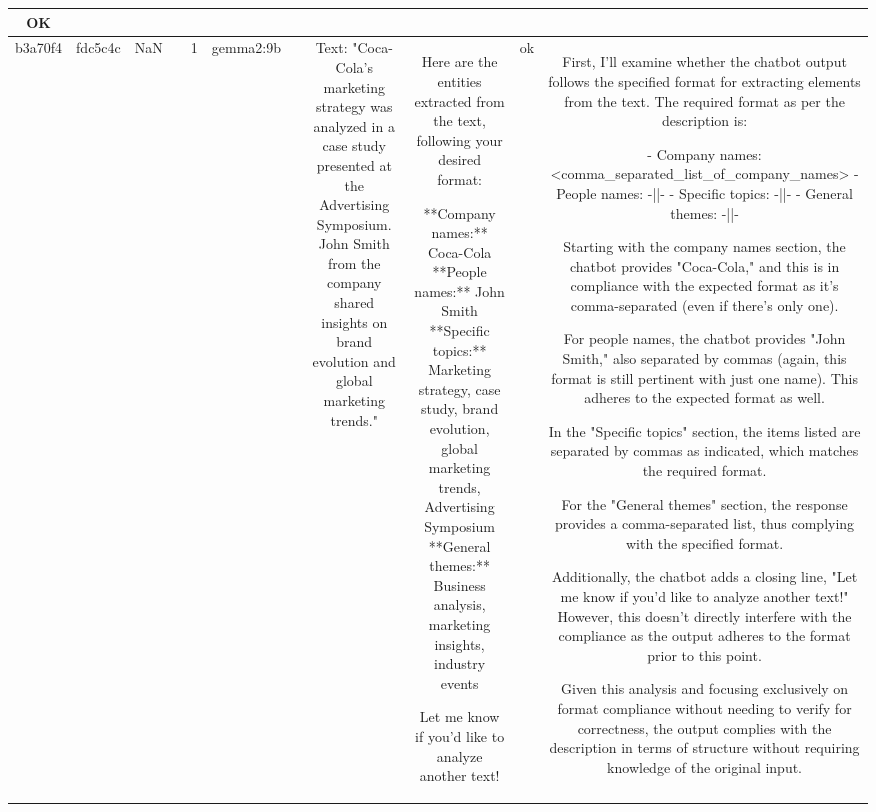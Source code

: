 \begin{table}[h!]
\begin{tabular}{|c|c|c|c|c|c|c|c|c|c|c|}
OK\\
\hline
b3a70f4 & fdc5c4c & NaN &  & 1 & gemma2:9b &  & Text: "Coca-Cola's marketing strategy was analyzed in a case study presented at the Advertising Symposium. John Smith from the company shared insights on brand evolution and global marketing trends." & Here are the entities extracted from the text, following your desired format:

**Company names:** Coca-Cola  
**People names:** John Smith 
**Specific topics:** Marketing strategy, case study, brand evolution, global marketing trends, Advertising Symposium  
**General themes:** Business analysis, marketing insights, industry events 


Let me know if you'd like to analyze another text! 
 & ok & First, I'll examine whether the chatbot output follows the specified format for extracting elements from the text. The required format as per the description is:

- Company names: <comma_separated_list_of_company_names>
- People names: -||-
- Specific topics: -||-
- General themes: -||-

Starting with the company names section, the chatbot provides "Coca-Cola," and this is in compliance with the expected format as it's comma-separated (even if there's only one).

For people names, the chatbot provides "John Smith," also separated by commas (again, this format is still pertinent with just one name). This adheres to the expected format as well.

In the "Specific topics" section, the items listed are separated by commas as indicated, which matches the required format.

For the "General themes" section, the response provides a comma-separated list, thus complying with the specified format.

Additionally, the chatbot adds a closing line, "Let me know if you'd like to analyze another text!" However, this doesn't directly interfere with the compliance as the output adheres to the format prior to this point.

Given this analysis and focusing exclusively on format compliance without needing to verify for correctness, the output complies with the description in terms of structure without requiring knowledge of the original input.


\end{tabular}
\end{table}
